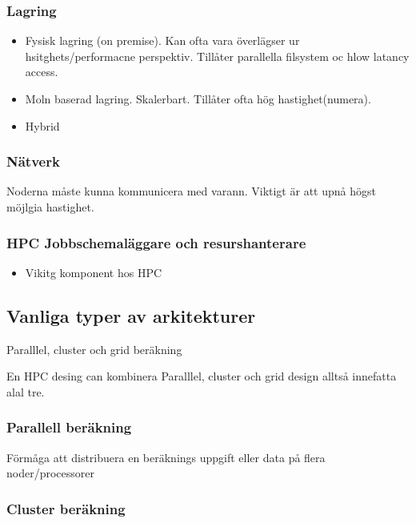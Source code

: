 \documentclass[
  letterpaper,
  DIV=11,
  numbers=noendperiod]{scrreprt}
\providecommand{\tightlist}{%
  \setlength{\itemsep}{0pt}\setlength{\parskip}{0pt}}\usepackage{longtable,booktabs,array}
\begin{document}
\subsubsection{Lagring}\label{lagring}

\begin{itemize}
\item
  Fysisk lagring (on premise). Kan ofta vara överlägser ur
  hsitghets/performacne perspektiv. Tillåter parallella filsystem oc
  hlow latancy access.
\item
  Moln baserad lagring. Skalerbart. Tillåter ofta hög hastighet(numera).
\item
  Hybrid
\end{itemize}

\subsubsection{Nätverk}\label{nuxe4tverk}

Noderna måste kunna kommunicera med varann. Viktigt är att upnå högst
möjlgia hastighet.

\subsubsection{HPC Jobbschemaläggare och
resurshanterare}\label{hpc-jobbschemaluxe4ggare-och-resurshanterare}

\begin{itemize}
\tightlist
\item
  Vikitg komponent hos HPC
\end{itemize}

\subsection{Vanliga typer av
arkitekturer}\label{vanliga-typer-av-arkitekturer}

Paralllel, cluster och grid beräkning

En HPC desing can kombinera Paralllel, cluster och grid design alltså
innefatta alal tre.

\subsubsection{Parallell beräkning}\label{parallell-beruxe4kning}

Förmåga att distribuera en beräknings uppgift eller data på flera
noder/processorer

\subsubsection{Cluster beräkning}\label{cluster-beruxe4kning}
\end{document}
